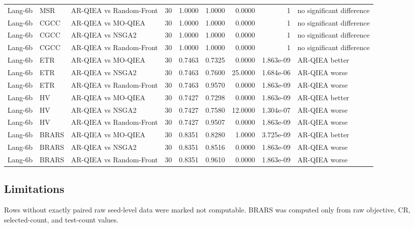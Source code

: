 \begin{tabular}{lllrrrrrl}
Lang-6b & MSR & AR-QIEA vs Random-Front & 30 & 1.0000 & 1.0000 & 0.0000 & 1 & no significant difference \\
Lang-6b & CGCC & AR-QIEA vs MO-QIEA & 30 & 1.0000 & 1.0000 & 0.0000 & 1 & no significant difference \\
Lang-6b & CGCC & AR-QIEA vs NSGA2 & 30 & 1.0000 & 1.0000 & 0.0000 & 1 & no significant difference \\
Lang-6b & CGCC & AR-QIEA vs Random-Front & 30 & 1.0000 & 1.0000 & 0.0000 & 1 & no significant difference \\
Lang-6b & ETR & AR-QIEA vs MO-QIEA & 30 & 0.7463 & 0.7325 & 0.0000 & 1.863e-09 & AR-QIEA better \\
Lang-6b & ETR & AR-QIEA vs NSGA2 & 30 & 0.7463 & 0.7600 & 25.0000 & 1.684e-06 & AR-QIEA worse \\
Lang-6b & ETR & AR-QIEA vs Random-Front & 30 & 0.7463 & 0.9570 & 0.0000 & 1.863e-09 & AR-QIEA worse \\
Lang-6b & HV & AR-QIEA vs MO-QIEA & 30 & 0.7427 & 0.7298 & 0.0000 & 1.863e-09 & AR-QIEA better \\
Lang-6b & HV & AR-QIEA vs NSGA2 & 30 & 0.7427 & 0.7580 & 12.0000 & 1.304e-07 & AR-QIEA worse \\
Lang-6b & HV & AR-QIEA vs Random-Front & 30 & 0.7427 & 0.9507 & 0.0000 & 1.863e-09 & AR-QIEA worse \\
Lang-6b & BRARS & AR-QIEA vs MO-QIEA & 30 & 0.8351 & 0.8280 & 1.0000 & 3.725e-09 & AR-QIEA better \\
Lang-6b & BRARS & AR-QIEA vs NSGA2 & 30 & 0.8351 & 0.8516 & 0.0000 & 1.863e-09 & AR-QIEA worse \\
Lang-6b & BRARS & AR-QIEA vs Random-Front & 30 & 0.8351 & 0.9610 & 0.0000 & 1.863e-09 & AR-QIEA worse \\
\end{tabular}
\subsection{Limitations}
Rows without exactly paired raw seed-level data were marked not computable. BRARS was computed only from raw objective, CR, selected-count, and test-count values.
